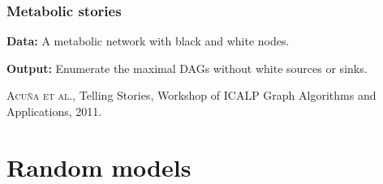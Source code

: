 \documentclass{beamer}
\begin{document}
\begin{frame}
\frametitle{Metabolic stories}

{\bf Data:} A metabolic network with black and white nodes.

{\bf Output:} Enumerate the maximal DAGs without white sources or sinks. 


\begin{figure}
\end{figure}






{\tiny \textsc{Acu\~na et al.}, Telling Stories,  Workshop of ICALP Graph Algorithms and Applications, 2011.}



\end{frame}











\section{Random models}







\end{document}
